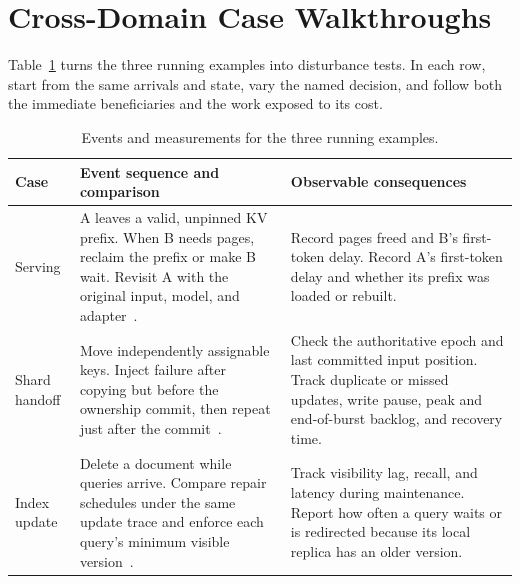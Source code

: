 \section{Cross-Domain Case Walkthroughs}

Table~\ref{tab:case-walkthroughs} turns the three running examples into disturbance tests. In each row, start from the same arrivals and state, vary the named decision, and follow both the immediate beneficiaries and the work exposed to its cost.

\begin{table}[H]
\small
\centering
\setlength{\tabcolsep}{4pt}
\caption{Events and measurements for the three running examples.}
\label{tab:case-walkthroughs}
\begin{tabular}{@{}p{}p{}p{}@{}}
\toprule
Case & Event sequence and comparison & Observable consequences \\
\midrule
Serving &
A leaves a valid, unpinned KV prefix. When B needs pages, reclaim the prefix or make B wait. Revisit A with the original input, model, and adapter~\cite{kwon2023pagedattention,hu2024memserve,liu2025lmcache}. &
Record pages freed and B's first-token delay. Record A's first-token delay and whether its prefix was loaded or rebuilt. \\
Shard handoff &
Move independently assignable keys. Inject failure after copying but before the ownership commit, then repeat just after the commit~\cite{carbone2015flink,nasir2019megaphone,mao2025spacker}. &
Check the authoritative epoch and last committed input position. Track duplicate or missed updates, write pause, peak and end-of-burst backlog, and recovery time. \\
Index update &
Delete a document while queries arrive. Compare repair schedules under the same update trace and enforce each query's minimum visible version~\cite{singh2021freshdiskann,xu2023spfresh,wang2026candor}. &
Track visibility lag, recall, and latency during maintenance. Report how often a query waits or is redirected because its local replica has an older version. \\
\bottomrule
\end{tabular}
\end{table}
